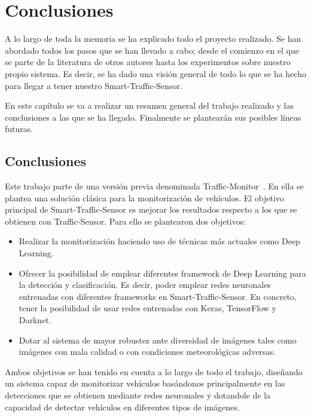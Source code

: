 \chapter{Conclusiones}\label{cap.conclusiones}

A lo largo de toda la memoria se ha explicado todo el proyecto realizado. Se han abordado todos los pasos que se han llevado a cabo; desde el comienzo en el que se parte de la literatura de otros autores hasta los experimentos sobre nuestro propio sistema. Es decir, se ha dado una visión general de todo lo que se ha hecho para llegar a tener nuestro Smart-Traffic-Sensor.

En este capítulo se va a realizar un resumen general del trabajo realizado y las conclusiones a las que se ha llegado. Finalmente se plantearán sus posibles líneas futuras.

\section{Conclusiones}

Este trabajo parte de una versión previa denominada Traffic-Monitor~\cite{traffic_monitor_redo}. En ella se plantea una solución clásica para la monitorización de vehículos. El objetivo principal de Smart-Traffic-Sensor es mejorar los resultados respecto a los que se obtienen con Traffic-Sensor. Para ello se plantearon dos  objetivos:
\begin{itemize}
    \item Realizar la monitorización haciendo uso de técnicas más actuales como Deep Learning.
    \item Ofrecer la posibilidad de emplear diferentes framework de Deep Learning para la detección y clasificación. Es decir, poder emplear redes neuronales entrenadas con diferentes frameworks en  Smart-Traffic-Sensor. En concreto, tener la posibilidad de usar redes entrenadas con Keras, TensorFlow y Darknet.
    \item Dotar al sistema de mayor robustez ante diversidad de imágenes tales como imágenes con mala calidad o con condiciones meteorológicas adversas.
\end{itemize}

Ambos objetivos se han tenido en cuenta a lo largo de todo el trabajo, diseñando un sistema capaz de monitorizar vehículos basándonos principalmente en las detecciones que se obtienen mediante redes neuronales y dotandole de la capacidad de detectar vehículos en diferentes tipos de imágenes.

